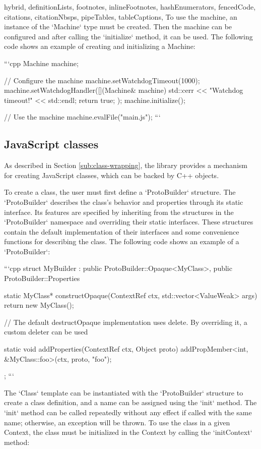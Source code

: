 \begin{markdown*}{%
  hybrid,
  definitionLists,
  footnotes,
  inlineFootnotes,
  hashEnumerators,
  fencedCode,
  citations,
  citationNbsps,
  pipeTables,
  tableCaptions,
}
To use the machine, an instance of the `Machine` type must be created. Then the machine can be configured and after calling the `initialize` method, it can be used. The following code shows an example of creating and initializing a Machine:

```cpp
Machine machine;

// Configure the machine
machine.setWatchdogTimeout(1000);
machine.setWatchdogHandler([](Machine& machine) {
  std::cerr << "Watchdog timeout!" << std::endl;
  return true;
});
machine.initialize();

// Use the machine
machine.evalFile("main.js");
```


\subsection{JavaScript classes}

As described in Section \ref{sub:class-wrapping}, the library provides a mechanism for creating JavaScript classes, which can be backed by C++ objects.

To create a class, the user must first define a `ProtoBuilder` structure. The `ProtoBuilder` describes the class's behavior and properties through its static interface. Its features are specified by inheriting from the structures in the `ProtoBuilder` namespace and overriding their static interfaces. These structures contain the default implementation of their interfaces and some convenience functions for describing the class. The following code shows an example of a `ProtoBuilder`:

```cpp
struct MyBuilder : public ProtoBuilder::Opaque<MyClass>, public ProtoBuilder::Properties {
  static MyClass* constructOpaque(ContextRef ctx, std::vector<ValueWeak> args) {
    return new MyClass();
  }

  // The default destructOpaque implementation uses delete. By overriding it, a custom deleter can be used

  static void addProperties(ContextRef ctx, Object proto) {
    addPropMember<int, &MyClass::foo>(ctx, proto, "foo");
  }
};
```

The `Class` template can be instantiated with the `ProtoBuilder` structure to create a class definition, and a name can be assigned using the `init` method. The `init` method can be called repeatedly without any effect if called with the same name; otherwise, an exception will be thrown. To use the class in a given Context, the class must be initialized in the Context by calling the `initContext` method:


\end{markdown*}
